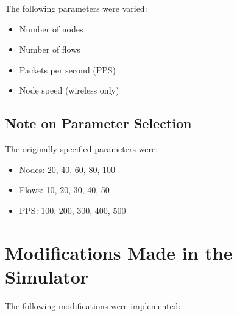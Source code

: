 \documentclass[11pt]{article}
\begin{document}
The following parameters were varied:

\begin{itemize}
    \item Number of nodes
    \item Number of flows
    \item Packets per second (PPS)
    \item Node speed (wireless only)
\end{itemize}

\subsection{Note on Parameter Selection}

The originally specified parameters were:

\begin{itemize}
    \item Nodes: 20, 40, 60, 80, 100
    \item Flows: 10, 20, 30, 40, 50
    \item PPS: 100, 200, 300, 400, 500
\end{itemize}



\section{Modifications Made in the Simulator}

The following modifications were implemented:
\end{document}
